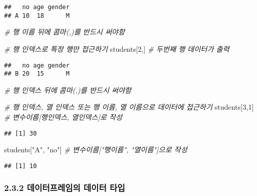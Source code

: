 \documentclass[
]{article}
\newenvironment{Shaded}{\begin{snugshade}}{\end{snugshade}}
\newcommand{\CommentTok}[1]{\textcolor[rgb]{0.56,0.35,0.01}{\textit{#1}}}
\newcommand{\DecValTok}[1]{\textcolor[rgb]{0.00,0.00,0.81}{#1}}
\newcommand{\NormalTok}[1]{#1}
\newcommand{\StringTok}[1]{\textcolor[rgb]{0.31,0.60,0.02}{#1}}
\begin{document}
\begin{verbatim}
##   no age gender
## A 10  18      M
\end{verbatim}

\begin{Shaded}
\begin{Highlighting}[]
                 \CommentTok{\# 행 이름 뒤에 콤마(,)를 반드시 써야함}

\CommentTok{\# 행 인덱스로 특정 행만 접근하기}
\NormalTok{students[}\DecValTok{2}\NormalTok{,]  }\CommentTok{\# 두번째 행 데이터가 출력}
\end{Highlighting}
\end{Shaded}

\begin{verbatim}
##   no age gender
## B 20  15      M
\end{verbatim}

\begin{Shaded}
\begin{Highlighting}[]
              \CommentTok{\# 행 인덱스 뒤에 콤마(,)를 반드시 써야함}

\CommentTok{\# 행 인덱스, 열 인덱스 또는 행 이름, 열 이름으로 데이터에 접근하기}
\NormalTok{students[}\DecValTok{3}\NormalTok{,}\DecValTok{1}\NormalTok{]        }\CommentTok{\# 변수이름[행인덱스, 열인덱스]로 작성}
\end{Highlighting}
\end{Shaded}

\begin{verbatim}
## [1] 30
\end{verbatim}

\begin{Shaded}
\begin{Highlighting}[]
\NormalTok{students[}\StringTok{"A"}\NormalTok{, }\StringTok{"no"}\NormalTok{]  }\CommentTok{\# 변수이름["행이름", "열이름"]으로 작성}
\end{Highlighting}
\end{Shaded}

\begin{verbatim}
## [1] 10
\end{verbatim}

\hypertarget{uxb370uxc774uxd130uxd504uxb808uxc784uxc758-uxb370uxc774uxd130-uxd0c0uxc785}{%
\subsubsection{2.3.2 데이터프레임의 데이터
타입}\label{uxb370uxc774uxd130uxd504uxb808uxc784uxc758-uxb370uxc774uxd130-uxd0c0uxc785}}
\end{document}
